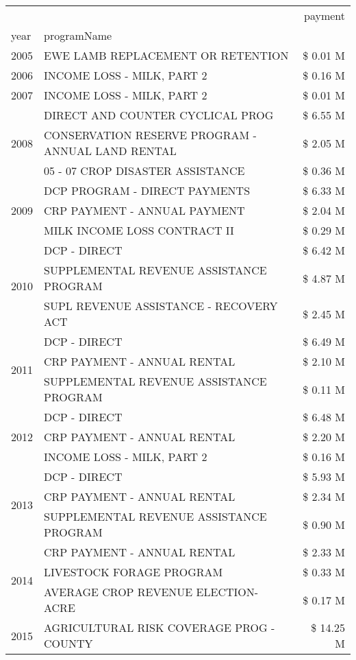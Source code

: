 \begin{tabular}{llr}
\toprule
 &  & payment \\
year & programName &  \\
\midrule
2005 & EWE LAMB REPLACEMENT OR RETENTION & \$ 0.01 M \\
\cline{1-3}
2006 & INCOME LOSS - MILK, PART 2 & \$ 0.16 M \\
\cline{1-3}
2007 & INCOME LOSS - MILK, PART 2 & \$ 0.01 M \\
\cline{1-3}
\multirow[t]{3}{*}{2008} & DIRECT AND COUNTER CYCLICAL PROG & \$ 6.55 M \\
 & CONSERVATION RESERVE PROGRAM - ANNUAL LAND RENTAL & \$ 2.05 M \\
 & 05 - 07 CROP DISASTER ASSISTANCE & \$ 0.36 M \\
\cline{1-3}
\multirow[t]{3}{*}{2009} & DCP PROGRAM - DIRECT PAYMENTS & \$ 6.33 M \\
 & CRP PAYMENT - ANNUAL PAYMENT & \$ 2.04 M \\
 & MILK INCOME LOSS CONTRACT II & \$ 0.29 M \\
\cline{1-3}
\multirow[t]{3}{*}{2010} & DCP - DIRECT & \$ 6.42 M \\
 & SUPPLEMENTAL REVENUE ASSISTANCE PROGRAM & \$ 4.87 M \\
 & SUPL REVENUE ASSISTANCE - RECOVERY ACT & \$ 2.45 M \\
\cline{1-3}
\multirow[t]{3}{*}{2011} & DCP - DIRECT & \$ 6.49 M \\
 & CRP PAYMENT - ANNUAL RENTAL & \$ 2.10 M \\
 & SUPPLEMENTAL REVENUE ASSISTANCE PROGRAM & \$ 0.11 M \\
\cline{1-3}
\multirow[t]{3}{*}{2012} & DCP - DIRECT & \$ 6.48 M \\
 & CRP PAYMENT - ANNUAL RENTAL & \$ 2.20 M \\
 & INCOME LOSS - MILK, PART 2 & \$ 0.16 M \\
\cline{1-3}
\multirow[t]{3}{*}{2013} & DCP - DIRECT & \$ 5.93 M \\
 & CRP PAYMENT - ANNUAL RENTAL & \$ 2.34 M \\
 & SUPPLEMENTAL REVENUE ASSISTANCE PROGRAM & \$ 0.90 M \\
\cline{1-3}
\multirow[t]{3}{*}{2014} & CRP PAYMENT - ANNUAL RENTAL & \$ 2.33 M \\
 & LIVESTOCK FORAGE PROGRAM & \$ 0.33 M \\
 & AVERAGE CROP REVENUE ELECTION-ACRE & \$ 0.17 M \\
\cline{1-3}
\multirow[t]{3}{*}{2015} & AGRICULTURAL RISK COVERAGE PROG - COUNTY & \$ 14.25 M \\

\end{tabular}
